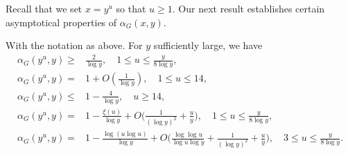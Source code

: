 \documentclass[twoside,leqno,10pt, A4]{amsart}
\begin{document}
  Recall that we set $x=y^u$ so that $u \geq 1$. Our next result establishes certain asymptotical properties of $\alpha_G(x,y)$. 
\begin{prop}
\label{lemsumpsigmalogp}
 With the notation as above. For $y$ sufficiently large, we have
\begin{align}
\label{alphalower}
   \alpha_G(y^u,y)\geq &\frac 2{\log y}, \quad 1 \leq u \leq \frac {y}{8\log y}, \\
\label{alphausmall}
   \alpha_G(y^u,y) = & 1+O(\frac {1}{\log y}),  \quad 1 \leq u \leq 14, \\
\label{alphaupper}
   \alpha_G(y^u,y)\leq & 1-\frac {4}{\log y},  \quad u \geq 14, \\  
\label{equ: Saddle point approx in intro}
\alpha_G(y^u,y) = & 1 - \frac{\xi(u)}{\log y} + O \biggl( \frac{1}{(\log y)^2}+\frac {u}{y}\biggr), \quad 1 \leq u \leq \frac {y}{8\log y}, \\
\label{equ: Saddle point approx in intro1}
  \alpha_G(y^u,y)=&  1 - \frac{\log(u\log u)}{\log y} + O \biggl( \frac{\log\log u}{\log u\log y}+\frac{1}{(\log y)^2}+\frac {u}{y}\biggr), \quad 3 \leq u \leq \frac {y}{8\log y}.
\end{align}
\end{prop}
\end{document}
